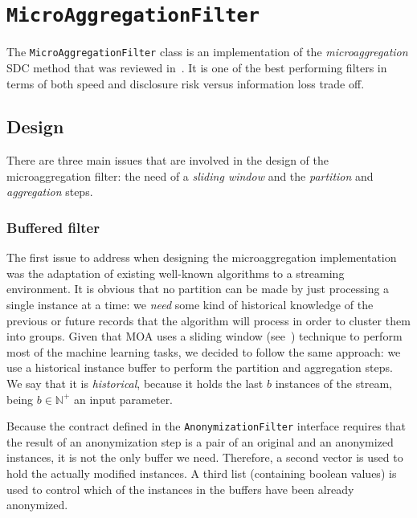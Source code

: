 \section{\texttt{MicroAggregationFilter}}
\label{Implementation:Microaggregation}

The \texttt{MicroAggregationFilter} class is an implementation of the \textit{microaggregation} SDC method that was reviewed in~. It is one of the best performing filters in terms of both speed and disclosure risk versus information loss trade off.

\subsection{Design}
\label{Implementation:Microaggregation:Design}

There are three main issues that are involved in the design of the microaggregation filter: the need of a \textit{sliding window} and the \textit{partition} and \textit{aggregation} steps.

\subsubsection{Buffered filter}
\label{Implementation:BufferedFilter}

The first issue to address when designing the microaggregation implementation was the adaptation of existing well-known algorithms to a streaming environment. It is obvious that no partition can be made by just processing a single instance at a time: we \textit{need} some kind of historical knowledge of the previous or future records that the algorithm will process in order to cluster them into groups. Given that MOA uses a sliding window (see~) technique to perform most of the machine learning tasks, we decided to follow the same approach: we use a historical instance buffer to perform the partition and aggregation steps. We say that it is \textit{historical}, because it holds the last $b$ instances of the stream, being $b \in \mathbb{N}^+$ an input parameter.

Because the contract defined in the \texttt{AnonymizationFilter} interface requires that the result of an anonymization step is a pair of an original and an anonymized instances, it is not the only buffer we need. Therefore, a second vector is used to hold the actually modified instances. A third list (containing boolean values) is used to control which of the instances in the buffers have been already anonymized.

